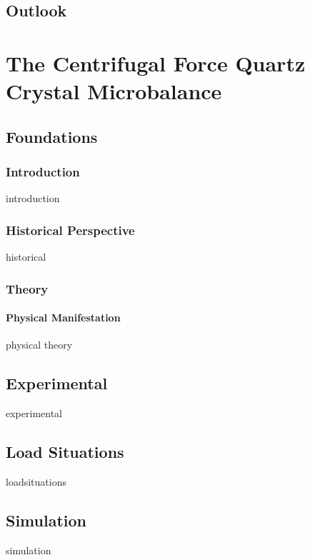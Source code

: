 \documentclass[a4paper,titlepage,onecolumn]{report}
\begin{document}
\chapter{Outlook} \label{ch:outlook}

\part{The Centrifugal Force Quartz Crystal Microbalance}
\chapter{Foundations} \label{ch:qcmfoundations}
        \section{Introduction}
        {introduction}
        \section{Historical Perspective}
        {historical}
        \section{Theory}
        \subsection{Physical Manifestation}
        {physical}
        {theory}
\chapter{Experimental} \label{ch:qcmexperimental}
{experimental}
\chapter{Load Situations} \label{ch:qcmloadsituations}
{loadsituations}
\chapter{Simulation} \label{ch:qcmsimulation}
{simulation}

\appendix
\end{document}
